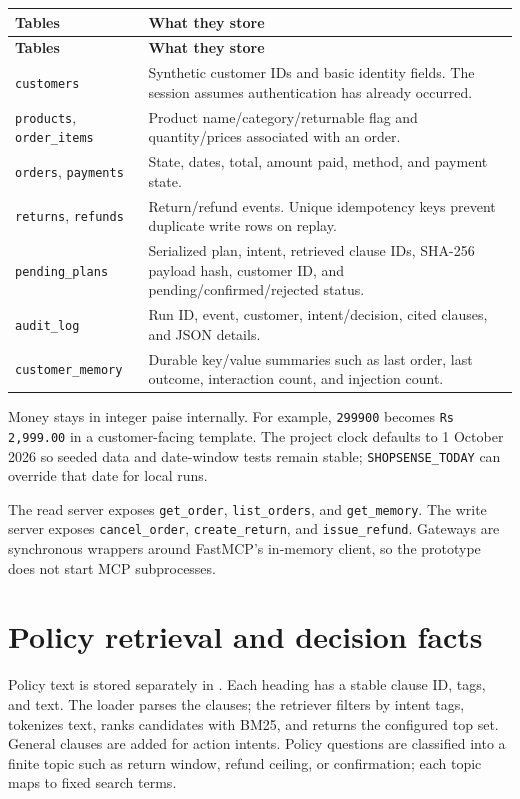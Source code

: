 \documentclass[11pt,a4paper]{article}
\begin{document}
\begin{longtable}{p{}p{}}
\toprule
\textbf{Tables} & \textbf{What they store} \\
\midrule
\endfirsthead
\toprule
\textbf{Tables} & \textbf{What they store} \\
\midrule
\endhead
\texttt{customers} & Synthetic customer IDs and basic identity fields. The session assumes authentication has already occurred. \\
\texttt{products}, \texttt{order\_items} & Product name/category/returnable flag and quantity/prices associated with an order. \\
\texttt{orders}, \texttt{payments} & State, dates, total, amount paid, method, and payment state. \\
\texttt{returns}, \texttt{refunds} & Return/refund events. Unique idempotency keys prevent duplicate write rows on replay. \\
\texttt{pending\_plans} & Serialized plan, intent, retrieved clause IDs, SHA-256 payload hash, customer ID, and pending/confirmed/rejected status. \\
\texttt{audit\_log} & Run ID, event, customer, intent/decision, cited clauses, and JSON details. \\
\texttt{customer\_memory} & Durable key/value summaries such as last order, last outcome, interaction count, and injection count. \\
\bottomrule
\end{longtable}

Money stays in integer paise internally. For example, \texttt{299900} becomes \texttt{Rs 2,999.00} in a customer-facing template. The project clock defaults to 1 October 2026 so seeded data and date-window tests remain stable; \texttt{SHOPSENSE\_TODAY} can override that date for local runs.

The read server exposes \texttt{get\_order}, \texttt{list\_orders}, and \texttt{get\_memory}. The write server exposes \texttt{cancel\_order}, \texttt{create\_return}, and \texttt{issue\_refund}. Gateways are synchronous wrappers around FastMCP's in-memory client, so the prototype does not start MCP subprocesses.

\section{Policy retrieval and decision facts}

Policy text is stored separately in . Each heading has a stable clause ID, tags, and text. The loader parses the clauses; the retriever filters by intent tags, tokenizes text, ranks candidates with BM25, and returns the configured top set. General clauses are added for action intents. Policy questions are classified into a finite topic such as return window, refund ceiling, or confirmation; each topic maps to fixed search terms.
\end{document}
